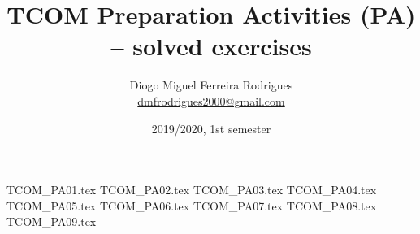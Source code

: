 \documentclass{tcom}
\title{TCOM Preparation Activities (PA) -- solved exercises}
\author{Diogo Miguel Ferreira Rodrigues \\ \href{mailto:dmfrodrigues2000@gmail.com}{dmfrodrigues2000@gmail.com}}
\date{2019/2020, 1st semester}
\begin{document}
\maketitle
\tableofcontents
{TCOM_PA01.tex}
{TCOM_PA02.tex}
{TCOM_PA03.tex}
{TCOM_PA04.tex}
{TCOM_PA05.tex}
{TCOM_PA06.tex}
{TCOM_PA07.tex}
{TCOM_PA08.tex}
{TCOM_PA09.tex}
\end{document}
